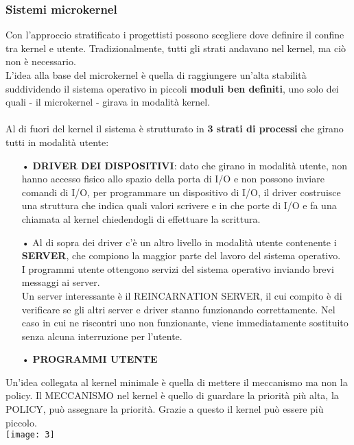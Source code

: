 \documentclass{article}
\begin{document}
\subsubsection{Sistemi microkernel}
Con l’approccio stratificato i progettisti possono scegliere dove definire il confine tra kernel e utente. Tradizionalmente, tutti gli strati andavano nel kernel, ma ciò non è necessario.\\
L’idea alla base del microkernel è quella di raggiungere un’alta stabilità suddividendo il sistema operativo in piccoli \textbf{moduli ben definiti}, uno solo dei quali - il microkernel - girava in modalità kernel.
\\
\\
Al di fuori del kernel il sistema è strutturato in \textbf{3 strati di processi} che girano tutti in modalità utente:
\begin{enumerate}
   \item[•] \textbf{DRIVER DEI DISPOSITIVI}: dato che girano in modalità utente, non hanno accesso fisico allo spazio della porta di I/O e non possono inviare comandi di I/O, per programmare un dispositivo di I/O, il driver costruisce una struttura che indica quali valori scrivere e in che porte di I/O e fa una chiamata al kernel chiedendogli di effettuare la scrittura.
   \item[•] Al di sopra dei driver c’è un altro livello in modalità utente contenente i \textbf{SERVER}, che compiono la maggior parte del lavoro del sistema operativo. \\I programmi utente ottengono servizi del sistema operativo inviando brevi messaggi ai server.
            \\Un server interessante è il REINCARNATION SERVER, il cui compito è di verificare se gli altri server e driver stanno funzionando correttamente. Nel caso in cui ne riscontri uno non funzionante, viene immediatamente sostituito senza alcuna interruzione per l’utente.
   \item[•] \textbf{PROGRAMMI UTENTE}
\end{enumerate}
Un’idea collegata al kernel minimale è quella di mettere il meccanismo ma non la policy. Il MECCANISMO nel kernel è quello di guardare la priorità più alta, la POLICY, può assegnare la priorità. Grazie a questo il kernel può essere più piccolo.
\\
\texttt{[image: 3]}

\newpage
\end{document}
